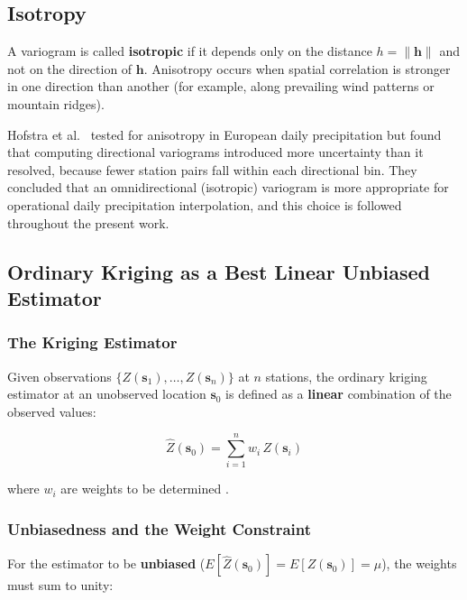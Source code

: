 \subsection{Isotropy}
\label{sec:isotropy}

A variogram is called \textbf{isotropic} if it depends only on the distance
$h = \|\mathbf{h}\|$ and not on the direction of $\mathbf{h}$.
Anisotropy occurs when spatial correlation is stronger in one direction than
another (for example, along prevailing wind patterns or mountain ridges).

Hofstra et al.~\cite{hofstra2008comparison} tested for anisotropy in European daily
precipitation but found that computing directional variograms introduced more
uncertainty than it resolved, because fewer station pairs fall within each
directional bin.
They concluded that an omnidirectional (isotropic) variogram is more
appropriate for operational daily precipitation interpolation, and this choice
is followed throughout the present work.


\subsection{Ordinary Kriging as a Best Linear Unbiased Estimator}
\label{sec:kriging_blue}

\subsubsection{The Kriging Estimator}

Given observations $\{Z(\mathbf{s}_1), \ldots, Z(\mathbf{s}_n)\}$ at $n$
stations, the ordinary kriging estimator at an unobserved location $\mathbf{s}_0$
is defined as a \textbf{linear} combination of the observed values:

\begin{equation}
    \hat{Z}(\mathbf{s}_0) = \sum_{i=1}^{n} w_i \, Z(\mathbf{s}_i)
    \label{eq:kriging_estimator}
\end{equation}

\noindent where $w_i$ are weights to be determined
\cite{matheron1963principles, hofstra2008comparison}.

\subsubsection{Unbiasedness and the Weight Constraint}

For the estimator to be \textbf{unbiased}
($E[\hat{Z}(\mathbf{s}_0)] = E[Z(\mathbf{s}_0)] = \mu$), the weights must
sum to unity:

